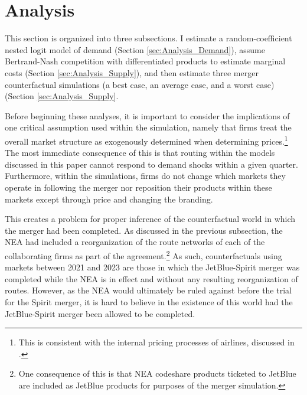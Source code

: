 \documentclass{article}
\begin{document}
	\section{Analysis}
	\label{sec:Analysis}
	
	This section is organized into three subsections. I estimate a random-coefficient nested logit model of demand (Section \ref{sec:Analysis_Demand}), assume Bertrand-Nash competition with differentiated products to estimate marginal costs (Section \ref{sec:Analysis_Supply}), and then estimate three merger counterfactual simulations (a best case, an average case, and a worst case) (Section \ref{sec:Analysis_Supply}. 
	
	Before beginning these analyses, it is important to consider the implications of one critical assumption used within the simulation, namely that firms treat the overall market structure as exogenously determined when determining prices.\footnote{This is consistent with the internal pricing processes of airlines, discussed in \citet{hortacsu_organizational_2024}.} The most immediate consequence of this is that routing within the models discussed in this paper cannot respond to demand shocks within a given quarter. Furthermore, within the simulations, firms do not change which markets they operate in following the merger nor reposition their products within these markets except through price and changing the branding. %
	
	This creates a problem for proper inference of the counterfactual world in which the merger had been completed. As discussed in the previous subsection, the NEA had included a reorganization of the route networks of each of the collaborating firms as part of the agreement.\footnote{One consequence of this is that NEA codeshare products ticketed to JetBlue are included as JetBlue products for purposes of the merger simulation.} As such, counterfactuals using markets between 2021 and 2023 are those in which the JetBlue-Spirit merger was completed while the NEA is in effect and without any resulting reorganization of routes. However, as the NEA would ultimately be ruled against before the trial for the Spirit merger, it is hard to believe in the existence of this world had the JetBlue-Spirit merger been allowed to be completed.
	
\end{document}
